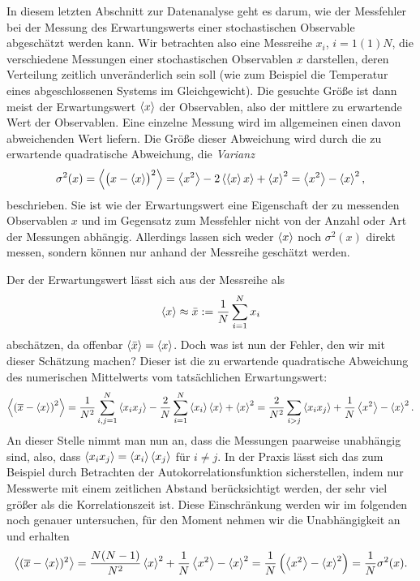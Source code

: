 In diesem letzten Abschnitt zur Datenanalyse geht es darum, wie der
Messfehler bei der Messung des Erwartungswerts einer stochastischen
Observable abgeschätzt werden kann. Wir betrachten also eine Messreihe
$x_i$, $i=1(1)N$, die verschiedene Messungen einer stochastischen
Observablen $x$ darstellen, deren Verteilung zeitlich unveränderlich
sein soll (wie zum Beispiel die Temperatur eines abgeschlossenen
Systems im Gleichgewicht). Die gesuchte Größe ist dann meist der
Erwartungswert $\left\langle{x}\right\rangle$ der Observablen, also der mittlere zu
erwartende Wert der Observablen. Eine einzelne Messung wird im
allgemeinen einen davon abweichenden Wert liefern. Die Größe dieser
Abweichung wird durch die zu erwartende quadratische Abweichung, die
\emph{Varianz}
\begin{equation}
  \sigma^2(x) = \left\langle{\bigl(x-\left\langle{x}\right\rangle\bigr)^2}\right\rangle
  = \left\langle{x^2}\right\rangle - 2\left\langle{\left\langle{x}\right\rangle x}\right\rangle  + \left\langle{x}\right\rangle^2
  = \left\langle{x^2}\right\rangle - \left\langle{x}\right\rangle^2,
\end{equation}
beschrieben. Sie ist wie der Erwartungswert eine Eigenschaft der zu
messenden Observablen $x$ und im Gegensatz zum Messfehler nicht von
der Anzahl oder Art der Messungen abhängig. Allerdings lassen sich
weder $\left\langle{x}\right\rangle$ noch $\sigma^2(x)$ direkt messen, sondern können nur
anhand der Messreihe geschätzt werden.

Der der Erwartungswert lässt sich aus der Messreihe
als
\begin{equation}
  \label{eq:mean}
  \left\langle{x}\right\rangle \approx \bar{x} := \frac{1}{N}\sum_{i=1}^N x_i
\end{equation}
abschätzen, da offenbar $\left\langle{\bar{x}}\right\rangle = \left\langle{x}\right\rangle$. Doch was ist nun der
Fehler, den wir mit dieser Schätzung machen? Dieser ist die zu
erwartende quadratische Abweichung des numerischen Mittelwerts vom
tatsächlichen Erwartungswert:
\begin{equation}
  \left\langle{\left(\overline{x} - \left\langle{x}\right\rangle\right)^2}\right\rangle =
  \frac{1}{N^2}\sum_{i,j=1}^N \left\langle{x_ix_j}\right\rangle -
  \frac{2}{N}\sum_{i=1}^N \left\langle{x_i}\right\rangle\left\langle{x}\right\rangle + \left\langle{x}\right\rangle^2
  = \frac{2}{N^2}\sum_{i > j} \left\langle{x_ix_j}\right\rangle
  + \frac{1}{N}\left\langle{x^2}\right\rangle - \left\langle{x}\right\rangle^2.
\end{equation}
An dieser Stelle nimmt man nun an, dass die Messungen paarweise
unabhängig sind, also, dass $\left\langle{x_ix_j}\right\rangle = \left\langle{x_i}\right\rangle\left\langle{x_j}\right\rangle$ für
$i\neq j$. In der Praxis lässt sich das zum Beispiel durch Betrachten
der Autokorrelationsfunktion sicherstellen, indem nur Messwerte mit
einem zeitlichen Abstand berücksichtigt werden, der sehr viel größer
als die Korrelationszeit ist. Diese Einschränkung werden wir im
folgenden noch genauer untersuchen, für den Moment nehmen wir die
Unabhängigkeit an und erhalten
\begin{equation}
  \label{eq:errestvar}
  \left\langle{(\overline{x} - \left\langle{x}\right\rangle)^2}\right\rangle
  = \frac{N(N-1)}{N^2}\left\langle{x}\right\rangle^2 + \frac{1}{N}\left\langle{x^2}\right\rangle - \left\langle{x}\right\rangle^2
  = \frac{1}{N}\left(\left\langle{x^2}\right\rangle - \left\langle{x}\right\rangle^2\right)
  = \frac{1}{N}\sigma^2(x).
\end{equation}

